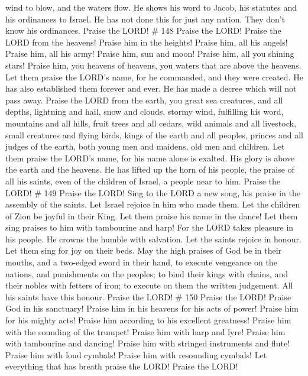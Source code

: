 wind to blow, and the waters flow.  He shows his word to
Jacob, his statutes and his ordinances to Israel.  He has
not done this for just any nation. They don't know his ordinances.
Praise the LORD! \# 148  Praise the LORD! Praise the LORD
from the heavens! Praise him in the heights!  Praise him,
all his angels! Praise him, all his army!  Praise him, sun
and moon! Praise him, all you shining stars!  Praise him,
you heavens of heavens, you waters that are above the heavens.
 Let them praise the LORD's name, for he commanded, and
they were created.  He has also established them forever
and ever. He has made a decree which will not pass away. 
Praise the LORD from the earth, you great sea creatures, and all depths,
 lightning and hail, snow and clouds, stormy wind,
fulfilling his word,  mountains and all hills, fruit trees
and all cedars,  wild animals and all livestock, small
creatures and flying birds,  kings of the earth and all
peoples, princes and all judges of the earth,  both young
men and maidens, old men and children.  Let them praise
the LORD's name, for his name alone is exalted. His glory is above the
earth and the heavens.  He has lifted up the horn of his
people, the praise of all his saints, even of the children of Israel, a
people near to him. Praise the LORD! \# 149  Praise the
LORD! Sing to the LORD a new song, his praise in the assembly of the
saints.  Let Israel rejoice in him who made them. Let the
children of Zion be joyful in their King.  Let them praise
his name in the dance! Let them sing praises to him with tambourine and
harp!  For the LORD takes pleasure in his people. He
crowns the humble with salvation.  Let the saints rejoice
in honour. Let them sing for joy on their beds.  May the
high praises of God be in their mouths, and a two-edged sword in their
hand,  to execute vengeance on the nations, and
punishments on the peoples;  to bind their kings with
chains, and their nobles with fetters of iron;  to execute
on them the written judgement. All his saints have this honour. Praise
the LORD! \# 150  Praise the LORD! Praise God in his
sanctuary! Praise him in his heavens for his acts of power!
 Praise him for his mighty acts! Praise him according to
his excellent greatness!  Praise him with the sounding of
the trumpet! Praise him with harp and lyre!  Praise him
with tambourine and dancing! Praise him with stringed instruments and
flute!  Praise him with loud cymbals! Praise him with
resounding cymbals!  Let everything that has breath praise
the LORD! Praise the LORD!

